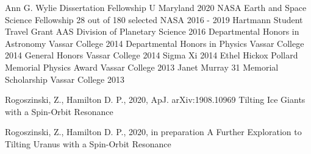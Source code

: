 \documentclass[]{awesome-cv}
\begin{document}
\vspace{-7mm}
\begin{cvhonors}
	\cvhonor
	{Ann G. Wylie Dissertation Fellowship}
	{}
	{U Maryland}
	{2020}
	\cvhonor
	{NASA Earth and Space Science Fellowship}
	{28 out of 180 selected}
	{NASA}
	{2016 - 2019}
	\cvhonor
	{Hartmann Student Travel Grant}
	{}
	{AAS Division of Planetary Science}
	{2016}
	\cvhonor
	{Departmental Honors in Astronomy}
	{}
	{Vassar College}
	{2014}
	\cvhonor
	{Departmental Honors in Physics}
	{}
	{Vassar College}
	{2014}
	\cvhonor
	{General Honors}
	{}
	{Vassar College}
	{2014}
	\cvhonor
	{Sigma Xi}
	{}
	{}
	{2014}
	\cvhonor
	{Ethel Hickox Pollard Memorial Physics Award}
	{}
	{Vassar College}
	{2013}
	\cvhonor
	{Janet Murray \textquotesingle{}31 Memorial Scholarship}
	{}
	{Vassar College}
	{2013}
\end{cvhonors}
\begin{cventries}
	\cventry
	{Rogoszinski, Z., Hamilton D. P., 2020, ApJ. arXiv:1908.10969}
	{Tilting Ice Giants with a Spin-Orbit Resonance}
	{}
	{}
	{}
	
	\vspace{-6mm}
\end{cventries}

\begin{cventries}
	\cventry
	{Rogoszinski, Z., Hamilton D. P., 2020, in preparation}
	{A Further Exploration to Tilting Uranus with a Spin-Orbit Resonance}
	{}
	{}
	{}
	
	\vspace{-6mm}
\end{cventries}
\end{document}
